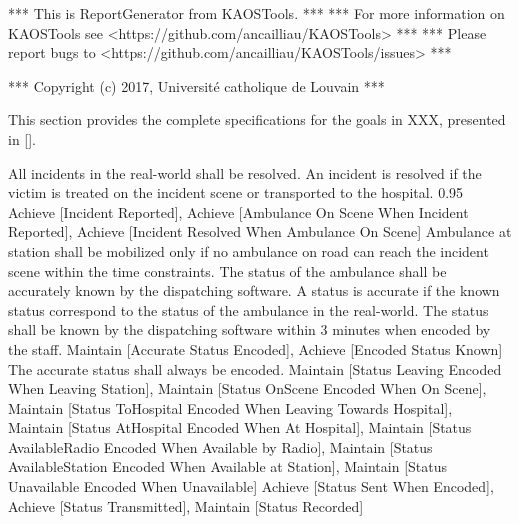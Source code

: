 *** This is ReportGenerator from KAOSTools. ***
*** For more information on KAOSTools see <https://github.com/ancailliau/KAOSTools> ***
*** Please report bugs to <https://github.com/ancailliau/KAOSTools/issues> ***

*** Copyright (c) 2017, Université catholique de Louvain ***

\startsubsection[title={Goal specifications}]

This section provides the complete specifications for the goals
in XXX, presented in [].

\startkaosspec
	 {All incidents in the real-world shall be resolved. An incident is resolved if the victim is treated on the incident scene or transported to the hospital.}
	 {0.95}
	 {Achieve [Incident Reported], Achieve [Ambulance On Scene When Incident Reported], Achieve [Incident Resolved When Ambulance On Scene]}
\stopkaosspec
\startkaosspec
	 {Ambulance at station shall be mobilized only if no ambulance on road can reach the incident scene within the time constraints.}
\stopkaosspec
\startkaosspec
	 {The status of the ambulance shall be accurately known by the dispatching software. A status is accurate if the known status correspond to the status of the ambulance in the real-world. The status shall be known by the dispatching software within 3 minutes when encoded by the staff.}
	 {Maintain [Accurate Status Encoded], Achieve [Encoded Status Known]}
\stopkaosspec
\startkaosspec
	 {The accurate status shall always be encoded.}
	 {Maintain [Status Leaving Encoded When Leaving Station], Maintain [Status OnScene Encoded When On Scene], Maintain [Status ToHospital Encoded When Leaving Towards Hospital], Maintain [Status AtHospital Encoded When At Hospital], Maintain [Status AvailableRadio Encoded When Available by Radio], Maintain [Status AvailableStation Encoded When Available at Station], Maintain [Status Unavailable Encoded When Unavailable]}
\stopkaosspec
\startkaosspec
	 {}
	 {Achieve [Status Sent When Encoded], Achieve [Status Transmitted], Maintain [Status Recorded]}
\stopkaosspec
\startkaosspec
